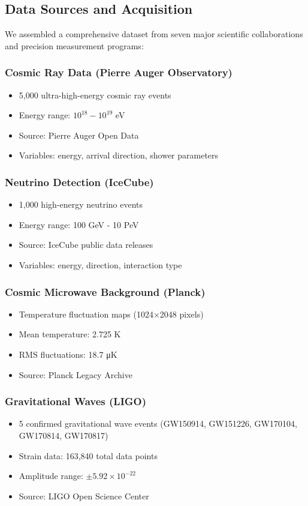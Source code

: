 \documentclass[12pt,a4paper]{article}
\begin{document}
\subsection{Data Sources and Acquisition}

We assembled a comprehensive dataset from seven major scientific collaborations and precision measurement programs:

\subsubsection{Cosmic Ray Data (Pierre Auger Observatory)}
\begin{itemize}
\item 5,000 ultra-high-energy cosmic ray events
\item Energy range: $10^{18} - 10^{19}$ eV
\item Source: Pierre Auger Open Data
\item Variables: energy, arrival direction, shower parameters
\end{itemize}

\subsubsection{Neutrino Detection (IceCube)}
\begin{itemize}
\item 1,000 high-energy neutrino events  
\item Energy range: 100 GeV - 10 PeV
\item Source: IceCube public data releases
\item Variables: energy, direction, interaction type
\end{itemize}

\subsubsection{Cosmic Microwave Background (Planck)}
\begin{itemize}
\item Temperature fluctuation maps (1024×2048 pixels)
\item Mean temperature: 2.725 K
\item RMS fluctuations: 18.7 μK
\item Source: Planck Legacy Archive
\end{itemize}

\subsubsection{Gravitational Waves (LIGO)}
\begin{itemize}
\item 5 confirmed gravitational wave events (GW150914, GW151226, GW170104, GW170814, GW170817)
\item Strain data: 163,840 total data points
\item Amplitude range: $\pm 5.92 \times 10^{-22}$
\item Source: LIGO Open Science Center
\end{itemize}
\end{document}
